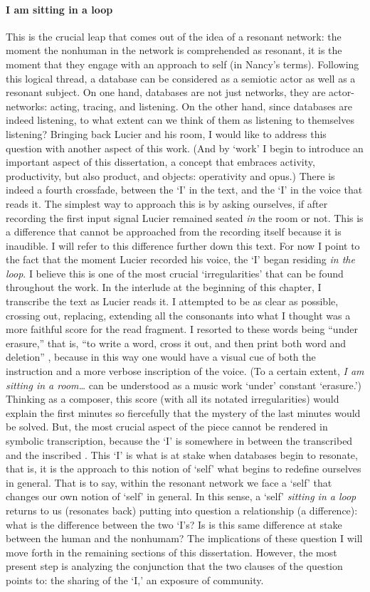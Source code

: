 \paragraph{I am sitting in a loop}
This is the crucial leap that comes out of the idea of a resonant network: the moment the nonhuman in the network is comprehended as resonant, it is the moment that they engage with an approach to self (in Nancy's terms). Following this logical thread, a database can be considered as a semiotic actor as well as a resonant subject. On one hand, databases are not just networks, they are actor-networks: acting, tracing, and listening. On the other hand, since databases are indeed listening, to what extent can we think of them as listening to themselves listening? Bringing back Lucier and his room, I would like to address this question with another aspect of this work. (And by `work' I begin to introduce an important aspect of this dissertation, a concept that embraces activity, productivity, but also product, and objects: operativity and opus.) There is indeed a fourth crossfade, between the `I' in the text, and the `I' in the voice that reads it. The simplest way to approach this is by asking ourselves, if after recording the first input signal Lucier remained seated \textit{in} the room or not. This is a difference that cannot be approached from the recording itself because it is inaudible. I will refer to this difference further down this text. For now I point to the fact that the moment Lucier recorded his voice, the `I' began residing \textit{in the loop}. I believe this is one of the most crucial `irregularities' that can be found throughout the work. In the interlude at the beginning of this chapter, I transcribe the text as Lucier reads it. I attempted to be as clear as possible, crossing out, replacing, extending all the consonants into what I thought was a more faithful score for the read fragment. I resorted to these words being ``under erasure,'' that is, ``to write a word, cross it out, and then print both word and deletion'' \parencite[xiv]{Der76:Of}, because in this way one would have a visual cue of both the instruction and a more verbose inscription of the voice. (To a certain extent, \textit{I am sitting in a room\dots} can be understood as a music work `under' constant `erasure.') Thinking as a composer, this score (with all its notated irregularities) would explain the first minutes so fiercefully that the mystery of the last minutes would be solved. But, the most crucial aspect of the piece cannot be rendered in symbolic transcription, because the `I' is somewhere in between the transcribed and the inscribed . This `I' is what is at stake when databases begin to resonate, that is, it is the approach to this notion of `self' what begins to redefine ourselves in general. That is to say, within the resonant network we face a `self' that changes our own notion of `self' in general. In this sense, a `self' \textit{sitting in a loop} returns to us (resonates back) putting into question a relationship (a difference): what is the difference between the two `I's? Is is this same difference at stake between the human and the nonhumam? The implications of these question I will move forth in the remaining sections of this dissertation. However, the most present step is analyzing the conjunction that the two clauses of the question points to: the sharing of the `I,' an exposure of community.

